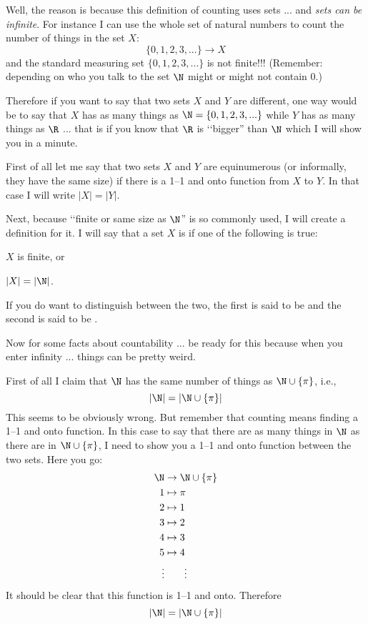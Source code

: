Well, the reason is because this definition of counting
uses sets ... and \textit{sets can be infinite}.
For instance
I can use the whole set of natural numbers to count
the number of things in the set $X$:
\[
\{0, 1, 2, 3, ...\} \rightarrow X
\] 
and the standard measuring set $\{0, 1, 2, 3, ...\}$ is not finite!!!
(Remember: depending on who you talk to the set $\N$ might or might not
contain 0.)

Therefore if you want to say that two sets $X$ and $Y$ are different,
one way would be to say that $X$ has as many things as 
$\N = \{0, 1, 2, 3, ...\}$
while $Y$ has as many things as $\R$ ... that is if you know that 
$\R$ is \lq\lq bigger'' than $\N$ which I will show you in a minute.

First of all let me say that two sets $X$ and $Y$ are equinumerous
(or informally, they have the same size) if there is a 1--1 and onto function
from $X$ to $Y$.
In that case I will write $|X| = |Y|$.

Next, because \lq\lq finite or same size as $\N$'' is so commonly used,
I will create a definition for it.
I will say that a set $X$ is  if one of the following
is true:
\begin{tightlist}
\item $X$ is finite, or
\item $|X| = |\N|$.
\end{tightlist}
If you do want to distinguish between the two, the first is said to be 
 and the second is said to be 
.

Now for some facts about countability ... be ready for this because
when you enter infinity ... things can be pretty weird.

First of all I claim that $\N$ has the same number of things
as $\N \cup \{\pi\}$, i.e.,
\[
|\N| = |\N \cup \{\pi\}|
\]
This seems to be obviously wrong.
But remember that counting means finding a 1--1 and onto function.
In this case to say that there are as many things in $\N$ as there
are in $\N \cup \{\pi\}$, I need to show you a 1--1 and onto function
between the two sets.
Here you go:
\begin{align*}
\N &\rightarrow \N \cup \{\pi\} \\
1 &\mapsto \pi \\
2 &\mapsto 1 \\
3 &\mapsto 2 \\
4 &\mapsto 3 \\
5 &\mapsto 4 \\
\vdots &\hspace{0.7cm} \vdots
\end{align*}
It should be clear that this function is 1--1 and onto.
Therefore
\[
|\N| = |\N \cup \{\pi\}|
\]


